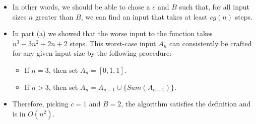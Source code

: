 \documentclass{article}
\begin{document}
\begin{enumerate}
\begin{enumerate}
\begin{itemize}
        \item In other words, we should be able to chose a $c$ and $B$ such that, for all input sizes $n$ greater than $B$, we can find an input that takes at least $cg(n)$ steps.
        \item In part (a) we showed that the worse input to the function takes $n^3 - 3n^2 + 2n + 2$ steps. This worst-case input $A_n$ can consistently be crafted for any given input size by the following procedure:
            \begin{itemize}
            \item If $n = 3$, then set $A_n = [0, 1, 1]$.
            \item If $n > 3$, then set $A_n = A_{n - 1} \cup \{ Sum(A_{n - 1}) \}$.
            \end{itemize}
        \item Therefore, picking $c = 1$ and $B = 2$, the algorithm satisfies the definition and is in $O(n^2)$.
        \end{itemize}
    \end{enumerate}


\end{enumerate}
\end{document}
